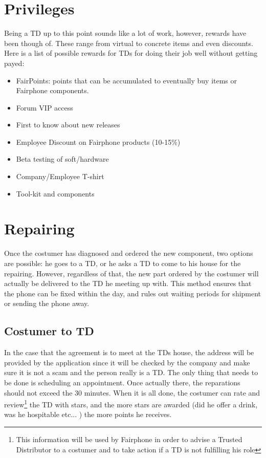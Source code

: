 \documentclass[final]{report} %
\begin{document}
\section{Privileges} 
Being a TD up to this point sounds like a lot of work, however, rewards have been though of. These range from virtual to concrete items and even discounts. Here is a list of possible rewards for TDs for doing their job well without getting payed:

\begin{itemize}
	\item FairPoints: points that can be accumulated to eventually buy items or Fairphone components.
	\item Forum VIP access
	\item First to know about new releases
	\item Employee Discount on Fairphone products (10-15\%)
	\item Beta testing of soft/hardware
	\item Company/Employee T-shirt
	\item Tool-kit and components
	\end{itemize}

\section{Repairing}
Once the costumer has diagnosed and ordered the new component, two options are possible: he goes to a TD, or he asks a TD to come to his house for the repairing. However, regardless of that, the new part ordered by the costumer will actually be delivered to the TD he meeting up with. This method ensures that the phone can be fixed within the day, and rules out waiting periods for shipment or sending the phone away.

\subsection{Costumer to TD} \label{subsec:costumer2td}
In the case that the agreement is to meet at the TDs house, the address will be provided by the application since it will be checked by the company and make sure it is not a scam and the person really is a TD. The only thing that needs to be done is scheduling an appointment. Once actually there, the reparations should not exceed the 30 minutes. When it is all done, the costumer can rate and review\footnote{This information will be used by Fairphone in order to advise a Trusted Distributor to a costumer and to take action if a TD is not fulfilling his role} the TD with stars, and the more stars are awarded (did he offer a drink, was he hospitable etc... ) the more points he receives.
\end{document}
